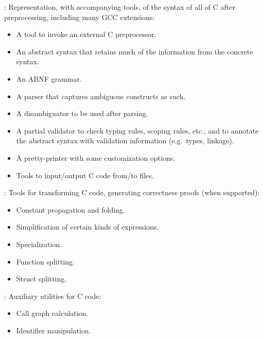 \begin{frame}

\newlibtitle

:
Representation, with accompanying tools,
of the syntax of all of C after preprocessing,
including many GCC extensions:
\begin{itemize}
\item A tool to invoke an external C preprocessor.
\item An abstract syntax that retains
      much of the information from the concrete syntax.
\item An ABNF grammar.
\item A parser that captures ambiguous constructs as such.
\item A disambiguator to be used after parsing.
\item A partial validator to check typing rules, scoping rules, etc.,
      and to annotate the abstract syntax with validation information
      (e.g.\ types, linkage).
\item A pretty-printer with some customization options.
\item Tools to input/output C code from/to files.
\end{itemize}

\end{frame}


\begin{frame}

\newlibtitle

:
Tools for transforming C code,
generating correctness proofs (when supported):
\begin{itemize}
\item Constant propagation and folding.
\item Simplification of certain kinds of expressions.
\item Specialization.
\item Function splitting.
\item Struct splitting.
\end{itemize}

\separation

:
Auxiliary utilities for C code:
\begin{itemize}
\item Call graph calculation.
\item Identifier manipulation.
\end{itemize}

\end{frame}

